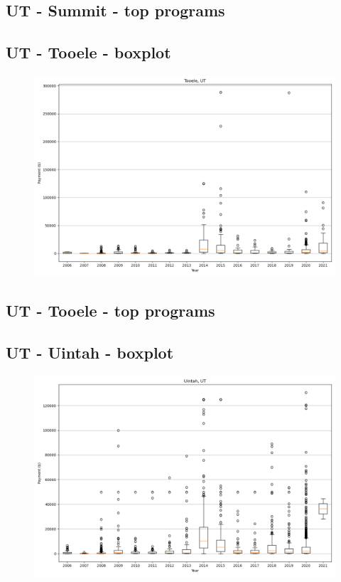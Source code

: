 \subsection*{UT - Summit - top programs}

\newpage
\subsection*{UT - Tooele - boxplot}
\begin{figure}[h]
\centering
\includegraphics[width=7in]{../output/boxplots/counties/Tooele-UT_boxplot.png}
\end{figure}


\subsection*{UT - Tooele - top programs}

\newpage
\subsection*{UT - Uintah - boxplot}
\begin{figure}[h]
\centering
\includegraphics[width=7in]{../output/boxplots/counties/Uintah-UT_boxplot.png}
\end{figure}


